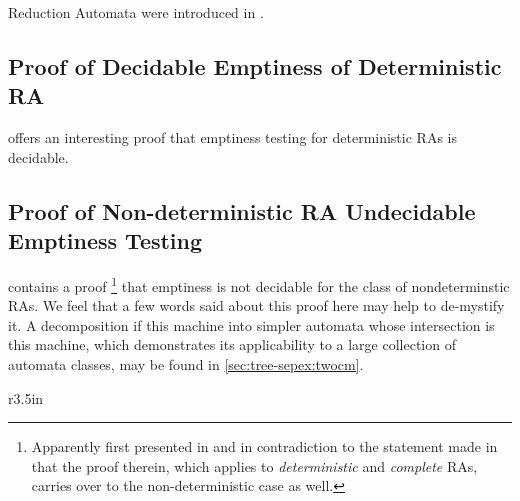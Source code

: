 Reduction Automata were introduced in \cite{dauchet:reduction}.



\subsection{Proof of Decidable Emptiness of Deterministic RA}

\cite[\S 4.1]{dauchet:reduction} offers an interesting proof that emptiness
testing for deterministic RAs is decidable.  

\subsection{Proof of Non-deterministic RA Undecidable Emptiness Testing}
\label{sec:zoo-tree/ra:ndempty}

\cite[Thm 4.4.7]{tata} contains a proof%
%
\footnote{Apparently first presented in \cite[Appendix
C]{jacquemard:tamodeq} and in contradiction to the statement made in
\cite[\S 4.1]{dauchet:reduction} that the proof therein, which applies to
{\em deterministic} and {\em complete} RAs, carries over to the
non-deterministic case as well.}
%
that emptiness is not decidable for the class of nondeterminstic RAs.  We feel that a few words said about this
proof here may help to de-mystify it.  A decomposition if this machine into
simpler automata whose intersection is this machine, which demonstrates its
applicability to a large collection of automata classes, may be found in
\ref{sec:tree-sepex:twocm}.

\begin{wrapfigure}{r}{3.5in}\centering{}\end{wrapfigure}

